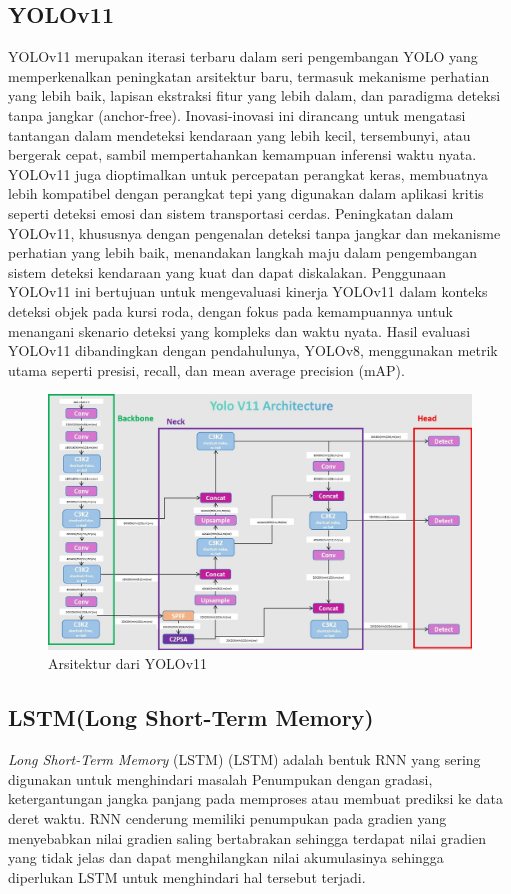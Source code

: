 \subsection{YOLOv11}
YOLOv11 merupakan iterasi terbaru dalam seri pengembangan YOLO yang memperkenalkan peningkatan arsitektur baru, termasuk mekanisme perhatian yang lebih baik, lapisan ekstraksi fitur yang lebih dalam, dan paradigma deteksi tanpa jangkar (anchor-free). Inovasi-inovasi ini dirancang untuk mengatasi tantangan dalam mendeteksi kendaraan yang lebih kecil, tersembunyi, atau bergerak cepat, sambil mempertahankan kemampuan inferensi waktu nyata. YOLOv11 juga dioptimalkan untuk percepatan perangkat keras, membuatnya lebih kompatibel dengan perangkat tepi yang digunakan dalam aplikasi kritis seperti deteksi emosi dan sistem transportasi cerdas.
Peningkatan dalam YOLOv11, khususnya dengan pengenalan deteksi tanpa jangkar dan mekanisme perhatian yang lebih baik, menandakan langkah maju dalam pengembangan sistem deteksi kendaraan yang kuat dan dapat diskalakan.
Penggunaan YOLOv11 ini bertujuan untuk mengevaluasi kinerja YOLOv11 dalam konteks deteksi objek pada kursi roda, dengan fokus pada kemampuannya untuk menangani skenario deteksi yang kompleks dan waktu nyata. Hasil evaluasi YOLOv11 dibandingkan dengan pendahulunya, YOLOv8, menggunakan metrik utama seperti presisi, recall, dan mean average precision (mAP).
\begin{figure} [H] \centering
  \includegraphics[width=\textwidth]{gambar/Arsitektur YOLOv11.jpg}
  \caption{Arsitektur dari YOLOv11 }
  \label{fig:YOLOv11}
\end{figure}
\subsection{LSTM(Long Short-Term Memory)}
\emph{Long Short-Term Memory} (LSTM) (LSTM) adalah bentuk RNN yang sering digunakan untuk menghindari masalah Penumpukan dengan gradasi, ketergantungan jangka panjang pada memproses atau membuat prediksi ke data deret waktu. RNN cenderung memiliki penumpukan pada gradien yang menyebabkan nilai gradien saling bertabrakan sehingga terdapat nilai gradien yang tidak jelas dan dapat menghilangkan nilai akumulasinya sehingga diperlukan LSTM untuk menghindari hal tersebut terjadi\cite{Cholissodin2019}.

